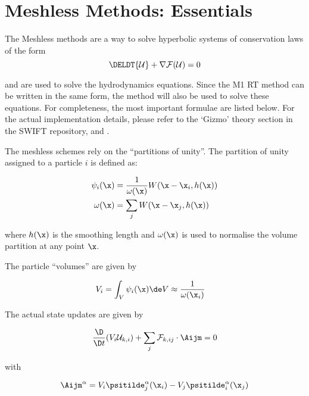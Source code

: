 \section{Meshless Methods: Essentials}

The Meshless methods are a way to solve hyperbolic systems of conservation laws of the form
\begin{equation}
    \DELDT{\mathcal{U}} + \nabla \mathcal{F}(\mathcal{U}) = 0 \label{eq:conservation-law}
\end{equation}

and are used to solve the hydrodynamics equations.
Since the M1 RT method can be written in the same form, the method will also be 
used to solve these equations. For completeness, the most important formulae are 
listed below. For the actual implementation details, please refer to the `Gizmo'
theory section in the SWIFT repository, and \cite{hopkinsGIZMONewClass2015}.



The meshless schemes rely on the ``partitions of unity''. 
The partition of unity assigned to a particle $i$ is defined as:

\begin{align}
	\psi_i(\x) &= \frac{1}{\omega(\x)} W(\x - \x_i, h(\x))		\label{eq:psi} \\
	\omega(\x) &= \sum_j W(\x - \x_j, h(\x)) 					\label{eq:omega}
\end{align}

where $h(\x)$ is the smoothing length and $\omega(\x)$ is used to normalise the 
volume partition at any point $\x$. 

The particle ``volumes'' are given by

\begin{align}
	V_i &= \int_V \psi_i(\x) \de V \approx \frac{1}{\omega(\x_i)} \label{psi_volume_integral}
\end{align}


The actual state updates are given by

\begin{equation}
	\frac{\D}{\D t} (V_i \mathcal{U}_{k,i}) + \sum_j \mathcal{F}_{k,ij} \cdot \Aijm = 0
\end{equation}


with

\begin{equation}
	\Aijm^\alpha = V_i \psitilde_j^\alpha (\x_i) - V_j\psitilde_i^\alpha (\x_j) 			\label{eq:HopkinsAij}
\end{equation}

